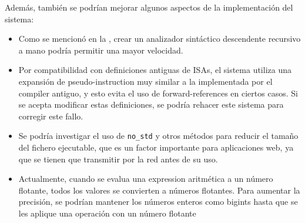 \noindent
Además, también se podrían mejorar algunos aspectos de la implementación del
sistema:

\begin{itemize}
    \item Como se mencionó en la , crear un analizador
    sintáctico descendente recursivo a mano podría permitir una mayor velocidad.
    \item Por compatibilidad con definiciones antiguas de \glspl{ISA}, el
    sistema utiliza una expansión de \gls{pseudo-instruction} muy similar a la
    implementada por el \gls{compiler} antiguo, y esto evita el uso de
    \glspl{forward-reference} en ciertos casos. Si se acepta modificar estas
    definiciones, se podría rehacer este sistema para corregir este fallo.
    \item Se podría investigar el uso de \verb!no_std! \parencite{no-std} y
    otros métodos para reducir el tamaño del fichero ejecutable, que es un
    factor importante para aplicaciones web, ya que se tienen que transmitir por
    la red antes de su uso.
    \item Actualmente, cuando se evalua una \gls{expression} aritmética a un
    número flotante, todos los valores se convierten a números flotantes. Para
    aumentar la precisión, se podrían mantener los números enteros como
    \glspl{bigint} hasta que se les aplique una operación con un número flotante
\end{itemize}
